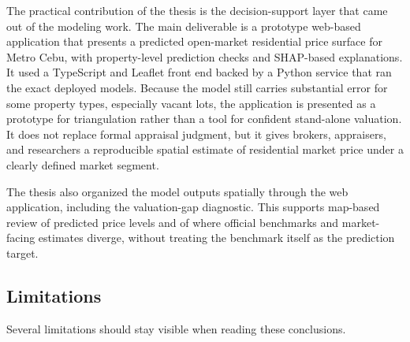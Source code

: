 The practical contribution of the thesis is the decision-support layer that came out of the modeling work. The main deliverable is a prototype web-based application that presents a predicted open-market residential price surface for Metro Cebu, with property-level prediction checks and SHAP-based explanations. It used a TypeScript and Leaflet front end backed by a Python service that ran the exact deployed models. Because the model still carries substantial error for some property types, especially vacant lots, the application is presented as a prototype for triangulation rather than a tool for confident stand-alone valuation. It does not replace formal appraisal judgment, but it gives brokers, appraisers, and researchers a reproducible spatial estimate of residential market price under a clearly defined market segment.

The thesis also organized the model outputs spatially through the web application, including the valuation-gap diagnostic. This supports map-based review of predicted price levels and of where official benchmarks and market-facing estimates diverge, without treating the benchmark itself as the prediction target.

\subsection{Limitations}\label{limitations-ch9}

Several limitations should stay visible when reading these conclusions.

